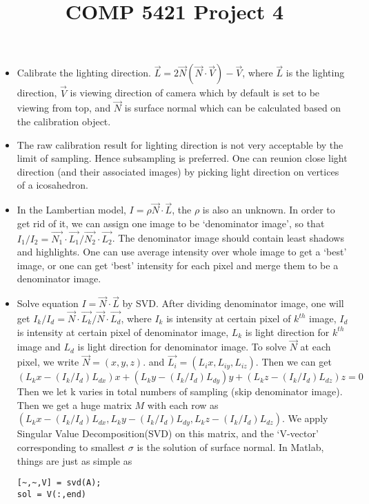 \documentclass [12pt] {article}
\title{COMP 5421 Project 4}
\begin{document}
\maketitle

\begin{itemize}
  \item Calibrate the lighting direction. $\vec{L} = 2\vec{N}(\vec{N}\cdot \vec{V})-\vec{V}$, where $\vec{L}$ is the lighting direction, $\vec{V}$ is viewing direction of camera which by default is set to be viewing from top, and $\vec{N}$ is surface normal which can be calculated based on the calibration object.

  \item The raw calibration result for lighting direction is not very acceptable by the limit of sampling. Hence subsampling is preferred. One can reunion close light direction (and their associated images) by picking light direction on vertices of a icosahedron.

  \item In the Lambertian model, $I = \rho \vec{N} \cdot \vec{L}$, the $\rho$ is also an unknown. In order to get rid of it, we can assign one image to be `denominator image', so that $I_{1}/I_{2} = \vec{N_{1}} \cdot \vec{L_{1}}/ \vec{N_{2}} \cdot \vec{L_{2}}$. The denominator image should contain least shadows and highlights. One can use average intensity over whole image to get a `best' image, or one can get `best' intensity for each pixel and merge them to be a denominator image.

  \item Solve equation $I = \vec{N} \cdot \vec{L}$ by SVD. After dividing denominator image, one will get $I_{k}/I_{d} = \vec{N} \cdot \vec{L_{k}}/ \vec{N} \cdot \vec{L_{d}}$, where $I_{k}$ is intensity at certain pixel of $k^{th}$ image, $I_{d}$ is intensity at certain pixel of denominator image, $L_{k}$ is light direction for $k^{th}$ image and $L_{d}$ is light direction for denominator image. To solve $\vec{N}$ at each pixel, we write $\vec{N} = (x, y, z)$. and $\vec{L_{i}} = (L{_ix}, L_{iy}, L_{iz})$. Then we can get $$(L{_kx}-(I_{k}/I_{d}) L_{dx})x+ (L{_ky}-(I_{k}/I_{d}) L_{dy})y+ (L{_kz}-(I_{k}/I_{d}) L_{dz})z = 0$$ Then we let k varies in total numbers of sampling (skip denominator image). Then we get a huge matrix $M$ with each row as $(L{_kx}-(I_{k}/I_{d}) L_{dx}, L{_ky}-(I_{k}/I_{d}) L_{dy}, L{_kz}-(I_{k}/I_{d}) L_{dz})$. We apply Singular Value Decomposition(SVD) on this matrix, and the `V-vector' corresponding to  smallest $\sigma$ is the solution of surface normal.  In Matlab, things are just as simple as
\lstset{basicstyle=\footnotesize\ttfamily,breaklines=true}
\lstset{framextopmargin=50pt}
 \begin{lstlisting}
[~,~,V] = svd(A);
sol = V(:,end)
  \end{lstlisting}


\end{itemize}
\end{document}
